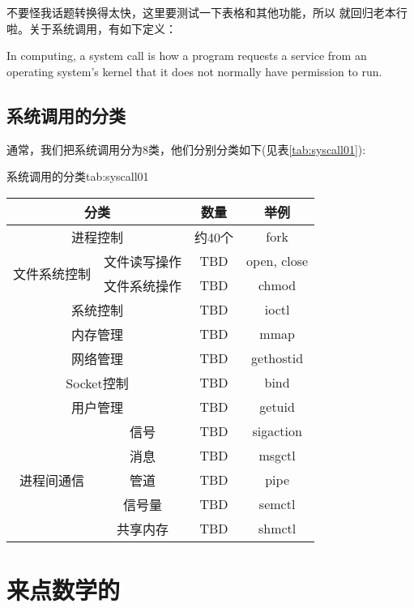 \documentclass[a4paper,oneside,12pt]{book}
\begin{document}
不要怪我话题转换得太快，这里要测试一下表格和其他功能，所以
就回归老本行啦。关于系统调用，有如下定义：

\begin{definition}
    In computing, a system call is how a program requests 
    a service from an operating system's kernel that it 
    does not normally have permission to run.
\end{definition}

\subsection{系统调用的分类}

通常，我们把系统调用分为8类，他们分别分类如下(见表\ref{tab:syscall01}):

\begin{bupttable}{系统调用的分类}{tab:syscall01}
    \begin{tabular}{c|c|c|c}
        \hline
        \multicolumn{2}{c|}{分类} & 数量 & 举例 \\ \hline
        \multicolumn{2}{c|}{进程控制} & 约40个 & fork \\ \hline
        \multirow{2}{*}{文件系统控制} & 文件读写操作 & TBD & open, close \\ \cline{2-4}
        & 文件系统操作 & TBD & chmod \\ \hline
        \multicolumn{2}{c|}{系统控制} & TBD & ioctl \\ \hline
        \multicolumn{2}{c|}{内存管理} & TBD & mmap \\ \hline
        \multicolumn{2}{c|}{网络管理} & TBD & gethostid \\ \hline
        \multicolumn{2}{c|}{Socket控制} & TBD & bind \\ \hline
        \multicolumn{2}{c|}{用户管理} & TBD & getuid \\ \hline
        \multirow{5}{*}{进程间通信} & 信号 & TBD & sigaction \\ \cline{2-4}
        & 消息 & TBD & msgctl \\ \cline{2-4}
        & 管道 & TBD & pipe \\ \cline{2-4}
        & 信号量 & TBD & semctl \\ \cline{2-4}
        & 共享内存 & TBD & shmctl \\ \hline
    \end{tabular}
\end{bupttable}

\section{来点数学的\cite{bib:inproceeding01}}
\end{document}
